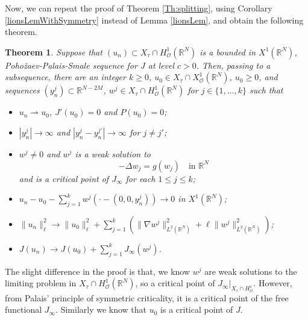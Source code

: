 \documentclass[12pt,leqno,twoside,sort]{amsart}
\newtheorem{Th}{Theorem}[section]
\newcommand{\R}{\mathbb{R}}
\newcommand{\weakto}{\rightharpoonup}
\numberwithin{equation}{section}
\begin{document}
Now, we can repeat the proof of Theorem \ref{Th:splitting}, using Corollary \ref{lionsLemWithSymmetry} instead of Lemma \ref{lionsLem}, and obtain the following theorem.

\begin{Th}\label{th:dekompNonradial}
Suppose that $(u_n) \subset X_\tau \cap H^1_{\mathcal{O}} (\R^N)$ is a bounded in $X^1(\R^N)$, Poho\v{z}aev-Palais-Smale sequence for $J$ at level $c > 0$. Then, passing to a subsequence, there are an integer $k \geq 0$, $u_0 \in X_\tau \cap X^1_{\mathcal{O}} (\R^N)$, $u_0\geq 0$, and sequences $(y_n^j) \subset \R^{N-2M}$, $w^j \in X_\tau \cap H^1_{\mathcal{O}} (\R^N)$ for $j\in \{1,\ldots, k\}$ such that

\begin{itemize}
\item[(a)] $u_n \weakto u_0$, $J'(u_0)=0$ and $P(u_0)=0$;
\item[(b)] $|y_n^j| \to \infty$ and $|y_n^j - y_n^{j'}|\to \infty$ for $j \neq j'$;
\item[(c)] $w^j \neq 0$ and $w^j$ is a weak solution to
$$
-\Delta w_j = g(w_j) \quad \mbox{in } \R^N
$$
and is a critical point of $J_{\infty}$ for each $1 \leq j \leq k$;
\item[(d)] $u_n - u_0 - \sum_{j=1}^k w^j (\cdot - (0,0,y_n^j)) \to 0$ in $X^1 (\R^N)$;
\item[(e)] $\|u_n\|^2_\ell\to \|u_0\|^2_\ell+\sum_{j=1}^k  \left( \|\nabla w^j\|_{L^2 (\R^N)}^2 + \ell \| w^j \|_{L^2 (\R^N)}^2 \right)$;
\item[(f)] $J(u_n) \to J(u_0) + \sum_{j=1}^k J_\infty (w^j)$.
\end{itemize}
\end{Th}

The slight difference in the proof is that, we know $w^j$ are weak solutions to the limiting problem in $X_\tau \cap H^1_\mathcal{O} (\R^N)$, so a critical point of $J_\infty |_{X_\tau \cap H^1_{\mathcal{O}}}$. However, from Palais' principle of symmetric criticality, it is a critical point of the free functional $J_\infty$. Similarly we know that $u_0$ is a critical point of $J$.
\end{document}
